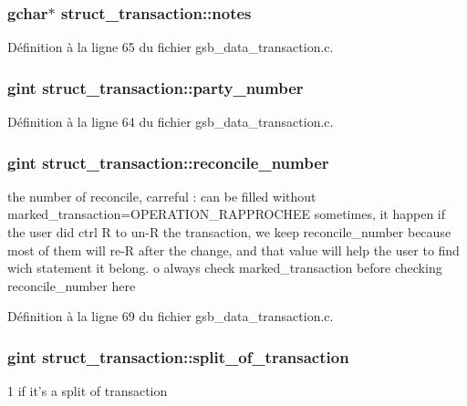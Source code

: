 \subsubsection[{notes}]{\setlength{\rightskip}{0pt plus 5cm}gchar$\ast$ {\bf struct\_\-transaction::notes}}\label{structstruct__transaction_a0189cfa17ca1a77dfe7280964d9e270b}


Définition à la ligne 65 du fichier gsb\_\-data\_\-transaction.c.

\subsubsection[{party\_\-number}]{\setlength{\rightskip}{0pt plus 5cm}gint {\bf struct\_\-transaction::party\_\-number}}\label{structstruct__transaction_abf1a3dd7f217fba7bea03ff4df01fb2e}


Définition à la ligne 64 du fichier gsb\_\-data\_\-transaction.c.

\subsubsection[{reconcile\_\-number}]{\setlength{\rightskip}{0pt plus 5cm}gint {\bf struct\_\-transaction::reconcile\_\-number}}\label{structstruct__transaction_a64fd9a097e270d8dfc136bd644772097}
the number of reconcile, carreful : can be filled without marked\_\-transaction=OPERATION\_\-RAPPROCHEE sometimes, it happen if the user did ctrl R to un-\/R the transaction, we keep reconcile\_\-number because most of them will re-\/R after the change, and that value will help the user to find wich statement it belong. o always check marked\_\-transaction before checking reconcile\_\-number here 

Définition à la ligne 69 du fichier gsb\_\-data\_\-transaction.c.

\subsubsection[{split\_\-of\_\-transaction}]{\setlength{\rightskip}{0pt plus 5cm}gint {\bf struct\_\-transaction::split\_\-of\_\-transaction}}\label{structstruct__transaction_a6a7a36aeafcf20c493b1f05b249896f4}
1 if it's a split of transaction 

